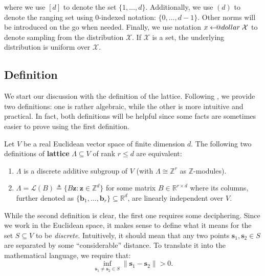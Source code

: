 \documentclass{template}
\makeatletter
\newcommand\leftarrowS{\leftarrow\joinrel\smalldollar}
\newcommand{\smalldollar}{\mathrel{\mathpalette\small@dollar\relax}}
\newcommand{\small@dollar}[2]{%
  \vcenter{\hbox{%
    $#1\textnormal{\fontsize{0.7\dimexpr\f@size pt}{0}\selectfont\$}$%
  }}%
}
\makeatother
\begin{document}
where we use $[d]$ to denote the set $\{1,\dots,d\}$. Additionally, we use $(d)$
to denote the ranging set using 0-indexed notation: $\{0,\dots,d-1\}$. Other
norms will be introduced on the go when needed. Finally, we use notation $x
\leftarrowS \mathcal{X}$ to denote sampling from the distribution $\mathcal{X}$.
If $\mathcal{X}$ is a set, the underlying distribution is uniform over
$\mathcal{X}$. 

\subsection{Definition}

We start our discussion with the definition of the lattice. Following
\cite{nist}, we provide two definitions: one is rather algebraic, while the
other is more intuitive and practical. In fact, both definitions will be helpful
since some facts are sometimes easier to prove using the first definition. 
\begin{definition}\label{def:lattice}
    Let $V$ be a real Euclidean vector space of finite dimension $d$. The
    following two definitions of \textbf{lattice} $\Lambda \subseteq V$ of rank
    $r \leq d$ are equivalent:
    \begin{enumerate}
        \item[\textit{(i)}] $\Lambda$ is a discrete additive subgroup of $V$
        (with $\Lambda \cong \mathbb{Z}^r$ as $\mathbb{Z}$-modules).
        \item[\textit{(ii)}] $\Lambda = \mathcal{L}(B) \triangleq \{B\mathbf{z}:
        \mathbf{z} \in \mathbb{Z}^d\}$ for some matrix $B \in \mathbb{R}^{r
        \times d}$ where its columns, further denoted as
        $\{\mathbf{b}_1,\dots,\mathbf{b}_r\} \subseteq \mathbb{R}^d$, are
        linearly independent over $V$. 
    \end{enumerate}
\end{definition}

While the second definition is clear, the first one requires some deciphering.
Since we work in the Euclidean space, it makes sense to define what it means for
the set $S \subseteq V$ to be \textit{discrete}. Intuitively, it should mean
that any two points $\mathbf{s}_1,\mathbf{s}_2 \in S$ are separated by some
``considerable'' distance. To translate it into the mathematical language, we
require that:
\begin{equation*}
    \inf_{\mathbf{s}_1 \neq \mathbf{s}_2 \in S} \|\mathbf{s}_1-\mathbf{s}_2\| > 0.
\end{equation*}
\end{document}
